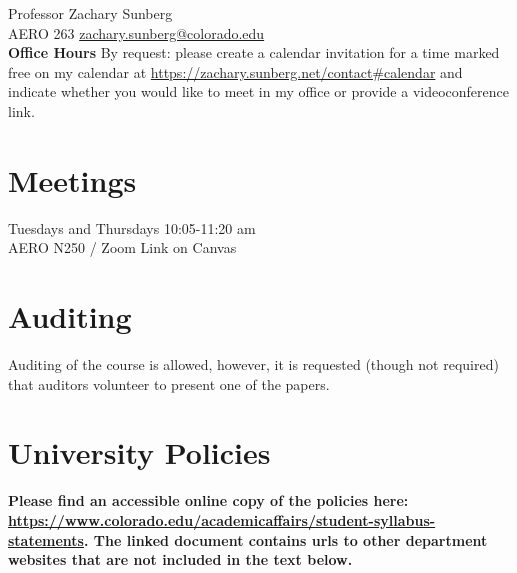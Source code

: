\documentclass[9pt]{article}
\begin{document}
Professor Zachary Sunberg\\
AERO 263 \href{mailto://zachary.sunberg@colorado.edu}{zachary.sunberg@colorado.edu}\\
\textbf{Office Hours}
By request: please create a calendar invitation for a time marked free on my calendar at \url{ https://zachary.sunberg.net/contact#calendar} and indicate whether you would like to meet in my office or provide a videoconference link. \\

\section*{Meetings}

Tuesdays and Thursdays 10:05-11:20 am\\
AERO N250 / Zoom Link on Canvas

\section*{Auditing}

Auditing of the course is allowed, however, it is requested (though not required) that auditors volunteer to present one of the papers.

\section*{University Policies}

\textbf{Please find an accessible online copy of the policies here: \url{https://www.colorado.edu/academicaffairs/student-syllabus-statements}. The linked document contains urls to other department websites that are not included in the text below.}
\end{document}
